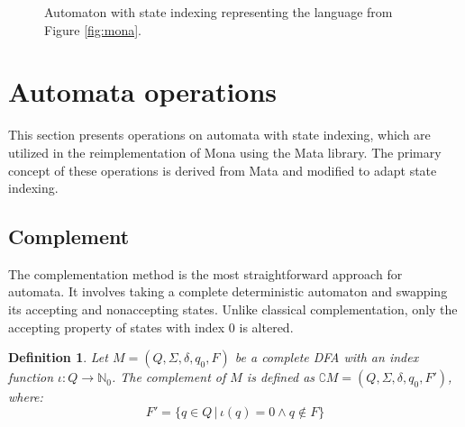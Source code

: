 \documentclass[pdflatex,sn-mathphys-num]{sn-jnl}%
\theoremstyle{thmstyleone}%
\theoremstyle{thmstyletwo}%
\theoremstyle{thmstylethree}%
\newtheorem{definition}{Definition}%
\begin{document}
        \begin{figure}[h]
            \centering
            \caption{Automaton with state indexing representing the language from Figure \ref{fig:mona}.}
        \end{figure}

\section{Automata operations}
    This section presents operations on automata with state indexing, which are utilized in the reimplementation of Mona using the Mata library. The primary concept of these operations is derived from Mata and modified to adapt state indexing.

    \subsection{Complement}
        The complementation method is the most straightforward approach for automata. It involves taking a complete deterministic automaton and swapping its accepting and nonaccepting states. Unlike classical complementation, only the accepting property of states with index $0$ is altered.

        \vspace*{0.5em}

        \begin{definition}
            Let $M = (Q, \Sigma, \delta, q_0, F)$ be a complete DFA with an index function $\iota : Q \rightarrow \mathbb{N}_0$. The complement of $M$ is defined as $\complement M = (Q, \Sigma, \delta, q_0, F')$, where:
            $$
            F' = \{q \in Q\,|\, \iota(q) = 0 \land q \notin F\}
            $$
        \end{definition}
\end{document}
